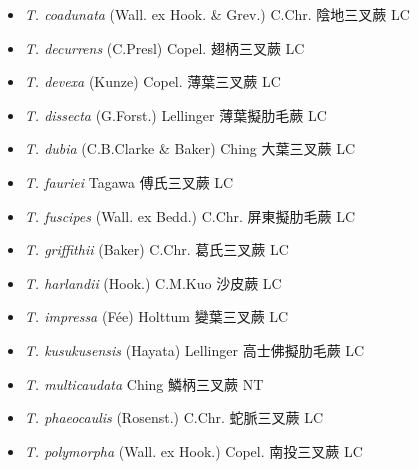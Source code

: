 \begin{itemize}
  \begin{itemize}
        \item[] \textit{T. coadunata} (Wall. ex Hook. \& Grev.) C.Chr.  陰地三叉蕨   LC
        \item[] \textit{T. decurrens} (C.Presl) Copel.  翅柄三叉蕨   LC
        \item[] \textit{T. devexa} (Kunze) Copel.  薄葉三叉蕨   LC
        \item[] \textit{T. dissecta} (G.Forst.) Lellinger  薄葉擬肋毛蕨   LC
        \item[] \textit{T. dubia} (C.B.Clarke \& Baker) Ching  大葉三叉蕨   LC
        \item[] \textit{T. fauriei} Tagawa  傅氏三叉蕨   LC
        \item[] \textit{T. fuscipes} (Wall. ex Bedd.) C.Chr.  屏東擬肋毛蕨   LC
        \item[] \textit{T. griffithii} (Baker) C.Chr.  葛氏三叉蕨   LC
        \item[] \textit{T. harlandii} (Hook.) C.M.Kuo  沙皮蕨   LC
        \item[] \textit{T. impressa} (Fée) Holttum  變葉三叉蕨   LC
        \item[] \textit{T. kusukusensis} (Hayata) Lellinger  高士佛擬肋毛蕨   LC
        \item[] \textit{T. multicaudata} Ching  鱗柄三叉蕨   NT
        \item[] \textit{T. phaeocaulis} (Rosenst.) C.Chr.  蛇脈三叉蕨   LC
        \item[] \textit{T. polymorpha} (Wall. ex Hook.) Copel.  南投三叉蕨   LC

\end{itemize}
\end{itemize}
